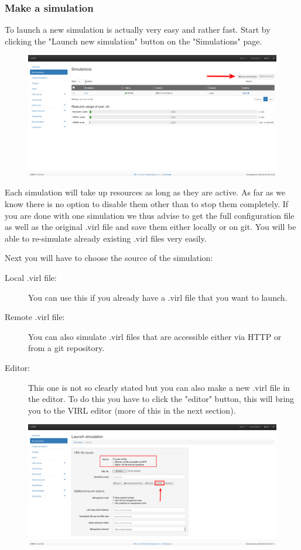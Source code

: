 \documentclass{article}
\begin{document}
\subsubsection{Make a simulation}
To launch a new simulation is actually very easy and rather fast. Start by clicking the "Launch new simulation" button on the "Simulations" page.\\

\begin{figure}[H]
	\centering
	\includegraphics[width=\textwidth]{images/Launch_new_simulation.png}
\end{figure}

Each simulation will take up resources as long as they are active.
As far as we know there is no option to disable them other than to stop them completely.
If you are done with one simulation we thus advise to get the full configuration file as well as the original .virl file and save them either locally or on git.
You will be able to re-simulate already existing .virl files very easily.

Next you will have to choose the source of the simulation:
\begin{description}
	\item[Local .virl file:] You can use this if you already have a .virl file that you want to launch.
	\item[Remote .virl file:] You can also simulate .virl files that are accessible either via HTTP or from a git repository.
	\item[Editor:] This one is not so clearly stated but you can also make a new .virl file in the editor. To do this you have to click the "editor" button, this will bring you to the VIRL editor (more of this in the next section).
\end{description}

\begin{figure}[H]
	\centering
	\includegraphics[width=\textwidth]{images/Simulation_config.png}
\end{figure}
\end{document}
